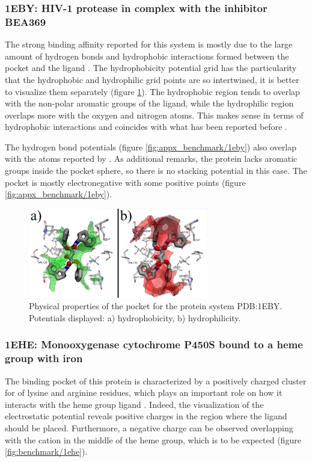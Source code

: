    \subsubsection{1EBY: HIV-1 protease in complex with the inhibitor BEA369}
      The strong binding affinity reported for this system is mostly due to the large amount of hydrogen bonds and hydrophobic interactions formed between the pocket and the ligand \cite{benchmark_strong_2021}. The hydrophobicity potential grid has the particularity that the hydrophobic and hydrophilic grid points are so intertwined, it is better to visualize them separately (figure \ref{fig:benchmark/1eby}). The hydrophobic region tends to overlap with the non-polar aromatic groups of the ligand, while the hydrophilic region overlaps more with the oxygen and nitrogen atoms. This makes sense in terms of hydrophobic interactions and coincides with what has been reported before \cite{benchmark_strong_2021}.

      The hydrogen bond potentials (figure \ref{fig:appx_benchmark/1eby}) also overlap with the atoms reported by \cite{benchmark_strong_2021}. As additional remarks, the protein lacks aromatic groups inside the pocket sphere, so there is no stacking potential in this case. The pocket is mostly electronegative with some positive points (figure \ref{fig:appx_benchmark/1eby}).

      \begin{figure}[H]
        \centering
        \includegraphics[width=0.7\textwidth]{figures/results/benchmark_prot/1eby.png}
        \caption{\label{fig:benchmark/1eby} Physical properties of the pocket for the protein system PDB:1EBY. Potentials displayed: a) hydrophobicity, b) hydrophilicity.}
      \end{figure}
    \pagebreak

    \subsubsection{1EHE: Monooxygenase cytochrome P450S bound to a heme group with iron}
      The binding pocket of this protein is characterized by a positively charged cluster for of lysine and arginine residues, which plays an important role on how it interacts with the heme group ligand \cite{benchmark_positive_2001}. Indeed, the visualization of the electrostatic potential reveals positive charges in the region where the ligand should be placed. Furthermore, a negative charge can be observed overlapping with the cation in the middle of the heme group, which is to be expected (figure \ref{fig:benchmark/1ehe}).

